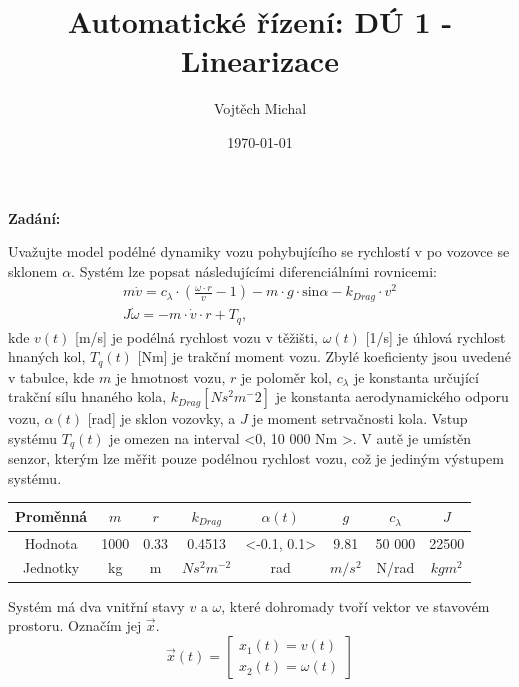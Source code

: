 \documentclass[twoside]{article}
\title{Automatické řízení: DÚ 1 - Linearizace}
\author{Vojtěch Michal}
\date{\today}
\begin{document}
\maketitle

\textbf{Zadání:}

Uvažujte model podélné dynamiky vozu pohybujícího se rychlostí v po vozovce se sklonem $\alpha$. Systém
lze popsat následujícími diferenciálními rovnicemi:
\begin{equation}
	\begin{split}
		m\dot{v} = c_\lambda \cdot \left(\frac{\omega \cdot r}{v} - 1 \right) - m \cdot g \cdot \text{sin} \alpha - k_{Drag} \cdot v^2 \\
		J \dot{\omega} = -m \cdot \dot{v} \cdot r + T_q,
	\end{split}
	\label{eq:zadani}
\end{equation}
kde $v(t)$ [m/s] je podélná
rychlost vozu v těžišti, $\omega(t)$ [1/s]
je úhlová rychlost hnaných
kol, $T_q(t)$ [Nm] je trakční
moment vozu. Zbylé koeficienty
jsou uvedené v tabulce, kde $m$ je
hmotnost vozu, $r$ je poloměr kol,
$c_\lambda $ je konstanta určující trakční
sílu hnaného kola, $k_{Drag} [Ns^2m^-2]$ je konstanta aerodynamického odporu vozu, $\alpha (t)$ [rad] je sklon
vozovky, a $J$ je moment setrvačnosti kola. Vstup systému $T_q(t)$ je omezen na interval <0, 10 000 Nm >.
 V autě je umístěn senzor, kterým lze měřit pouze podélnou rychlost vozu, což je jediným výstupem systému.

 \begin{table}[htbp]
	 \centering
	 \begin{tabular}{c|c|c|c|c|c|c|c}
		Proměnná & $m$ & $r$ & $k_{Drag}$ & $\alpha(t)$ & $g$ & $c_\lambda$ & $J$ \\
		\hline
		Hodnota & 1000 & 0.33 & 0.4513 & <-0.1, 0.1> & 9.81 & 50 000 & 22500 \\
		\hline
		Jednotky & kg & m & $Ns^2m^{-2} $ & rad & $m/s^2 $ & N/rad & $kg m^2$		 
	 \end{tabular}
 \end{table}
Systém má dva vnitřní stavy $v$ a $\omega$, které dohromady tvoří vektor ve stavovém prostoru. Označím jej $\vec{x}$.
\begin{equation}
	\vec{x}(t) = \begin{bmatrix}
		x_1(t) = v(t) \\
		x_2(t) = \omega(t)
	\end{bmatrix}
\end{equation}

\end{document}
